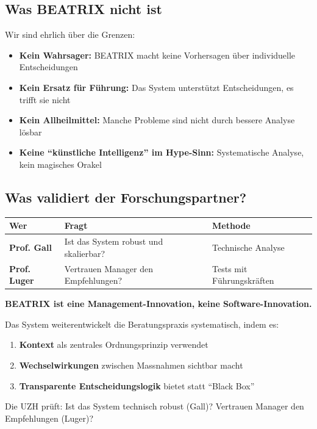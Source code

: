 \documentclass[11pt,a4paper]{article}
\begin{document}
\subsection{Was BEATRIX nicht ist}

\begin{limitbox}
Wir sind ehrlich über die Grenzen:
\begin{itemize}[noitemsep]
    \item \textbf{Kein Wahrsager:} BEATRIX macht keine Vorhersagen über individuelle Entscheidungen
    \item \textbf{Kein Ersatz für Führung:} Das System unterstützt Entscheidungen, es trifft sie nicht
    \item \textbf{Kein Allheilmittel:} Manche Probleme sind nicht durch bessere Analyse lösbar
    \item \textbf{Keine ``künstliche Intelligenz'' im Hype-Sinn:} Systematische Analyse, kein magisches Orakel
\end{itemize}
\end{limitbox}

\subsection{Was validiert der Forschungspartner?}

\begin{table}[h]
\centering
\begin{tabularx}{\textwidth}{lXl}
\toprule
\textbf{Wer} & \textbf{Fragt} & \textbf{Methode} \\
\midrule
\textbf{Prof. Gall} & Ist das System robust und skalierbar? & Technische Analyse \\
\textbf{Prof. Luger} & Vertrauen Manager den Empfehlungen? & Tests mit Führungskräften \\
\bottomrule
\end{tabularx}
\end{table}

\begin{summarybox}
\textbf{BEATRIX ist eine Management-Innovation, keine Software-Innovation.}

Das System weiterentwickelt die Beratungspraxis systematisch, indem es:
\begin{enumerate}[noitemsep]
    \item \textbf{Kontext} als zentrales Ordnungsprinzip verwendet
    \item \textbf{Wechselwirkungen} zwischen Massnahmen sichtbar macht
    \item \textbf{Transparente Entscheidungslogik} bietet statt ``Black Box''
\end{enumerate}

Die UZH prüft: Ist das System technisch robust (Gall)? Vertrauen Manager den Empfehlungen (Luger)?
\end{summarybox}
\end{document}
